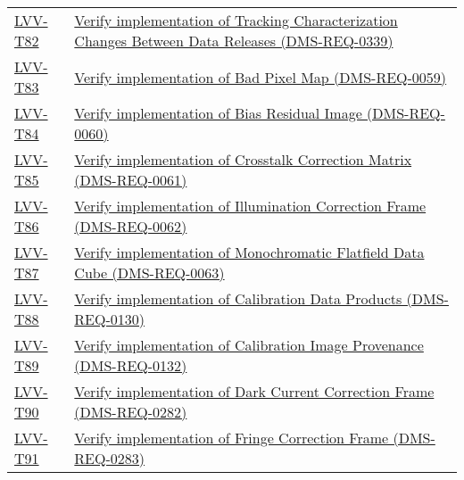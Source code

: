 \begin{longtable}[]{p{3cm}p{13cm}}
\protect\hyperlink{lvv-t82---verify-implementation-of-tracking-characterization-changes-between-data-releases-dms-req-0339}{LVV-T82}
&
\href{https://jira.lsstcorp.org/secure/Tests.jspa\#/testCase/LVV-T82}{Verify
implementation of Tracking Characterization Changes Between Data
Releases (DMS-REQ-0339)}\tabularnewline
\protect\hyperlink{lvv-t83---verify-implementation-of-bad-pixel-map-dms-req-0059}{LVV-T83}
&
\href{https://jira.lsstcorp.org/secure/Tests.jspa\#/testCase/LVV-T83}{Verify
implementation of Bad Pixel Map (DMS-REQ-0059)}\tabularnewline
\protect\hyperlink{lvv-t84---verify-implementation-of-bias-residual-image-dms-req-0060}{LVV-T84}
&
\href{https://jira.lsstcorp.org/secure/Tests.jspa\#/testCase/LVV-T84}{Verify
implementation of Bias Residual Image (DMS-REQ-0060)}\tabularnewline
\protect\hyperlink{lvv-t85---verify-implementation-of-crosstalk-correction-matrix-dms-req-0061}{LVV-T85}
&
\href{https://jira.lsstcorp.org/secure/Tests.jspa\#/testCase/LVV-T85}{Verify
implementation of Crosstalk Correction Matrix
(DMS-REQ-0061)}\tabularnewline
\protect\hyperlink{lvv-t86---verify-implementation-of-illumination-correction-frame-dms-req-0062}{LVV-T86}
&
\href{https://jira.lsstcorp.org/secure/Tests.jspa\#/testCase/LVV-T86}{Verify
implementation of Illumination Correction Frame
(DMS-REQ-0062)}\tabularnewline
\protect\hyperlink{lvv-t87---verify-implementation-of-monochromatic-flatfield-data-cube-dms-req-0063}{LVV-T87}
&
\href{https://jira.lsstcorp.org/secure/Tests.jspa\#/testCase/LVV-T87}{Verify
implementation of Monochromatic Flatfield Data Cube
(DMS-REQ-0063)}\tabularnewline
\protect\hyperlink{lvv-t88---verify-implementation-of-calibration-data-products-dms-req-0130}{LVV-T88}
&
\href{https://jira.lsstcorp.org/secure/Tests.jspa\#/testCase/LVV-T88}{Verify
implementation of Calibration Data Products
(DMS-REQ-0130)}\tabularnewline
\protect\hyperlink{lvv-t89---verify-implementation-of-calibration-image-provenance-dms-req-0132}{LVV-T89}
&
\href{https://jira.lsstcorp.org/secure/Tests.jspa\#/testCase/LVV-T89}{Verify
implementation of Calibration Image Provenance
(DMS-REQ-0132)}\tabularnewline
\protect\hyperlink{lvv-t90---verify-implementation-of-dark-current-correction-frame-dms-req-0282}{LVV-T90}
&
\href{https://jira.lsstcorp.org/secure/Tests.jspa\#/testCase/LVV-T90}{Verify
implementation of Dark Current Correction Frame
(DMS-REQ-0282)}\tabularnewline
\protect\hyperlink{lvv-t91---verify-implementation-of-fringe-correction-frame-dms-req-0283}{LVV-T91}
&
\href{https://jira.lsstcorp.org/secure/Tests.jspa\#/testCase/LVV-T91}{Verify
implementation of Fringe Correction Frame (DMS-REQ-0283)}\tabularnewline

\end{longtable}
